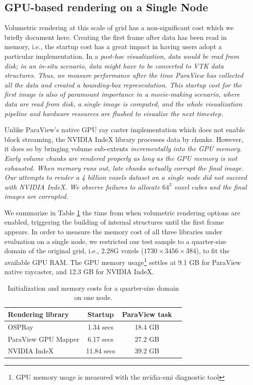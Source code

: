 \documentclass[5p,times]{elsarticle}
\begin{document}
\subsection{GPU-based rendering on a Single Node}

Volumetric rendering at this scale of grid has a non-significant cost which we
briefly document here. Creating the first frame after data has been read in memory,
 i.e., the startup cost has a great impact in having users adopt a particular implementation.
In a \it{post-hoc} \rm visualization, data would be read from disk; in an \it{in-situ} \rm
scenario, data might have to be converted to VTK data structures. Thus, we measure performance
after the time ParaView has collected all the data and created a bounding-box representation.
This startup cost for the first image is also of paramount importance in a movie-making scenario,
where data are read from disk, a single image is computed, and the whole visualization pipeline
and hardware resources are flushed to visualize the next timestep.

Unlike ParaView's native GPU ray caster implementation which does not enable block
streaming, the NVIDIA IndeX library processes data by chunks. However, it does so
by bringing volume sub-extents \it{incrementally} \rm into the GPU memory.
Early volume chunks are rendered properly as long as the GPU memory is not exhausted.
When memory runs out, late chunks actually corrupt the final image. Our attempts to
render a 4 billion voxels dataset on a single node did not succeed with NVIDIA IndeX.
We observe failures to allocate $64^3$ voxel cubes and the final images are corrupted.

We summarize in Table \ref{tab:firstframe-tab} the time from when volumetric rendering options
are enabled, triggering the building of internal structures until the first frame appears.
In order to measure the memory cost of all three libraries under evaluation on a single node,
we restricted our test sample to a quarter-size domain of the original grid, i.e., 2.28G voxels
($ 1730 \times 3456 \times 384 $), to fit the available GPU RAM. The GPU memory
usage\footnote{GPU memory usage is measured with the nvidia-smi diagnostic tool}
settles at 9.1 GB for ParaView native raycaster, and 12.3 GB for NVIDIA IndeX. 

\begin{table}[htb]
  \centering
  \caption{
    Initialization and memory costs for a quarter-size domain on one node.
  }
  \label{tab:firstframe-tab}

  \begin{tabular}{lccc}
    \hline
    Rendering library & Startup & ParaView task\\
    \hline
    OSPRay & 1.34 secs &  18.4 GB \\
    ParaView GPU Mapper & 6.17 secs &  27.2 GB \\
    NVIDIA IndeX & 11.84 secs &  39.2 GB\\
    \hline

  \end{tabular}
\end{table}
\end{document}
